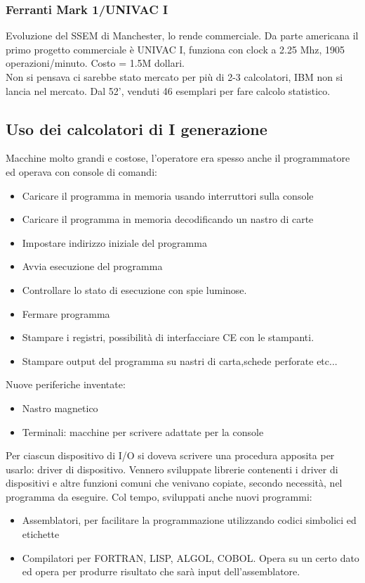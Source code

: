 \documentclass[12pt, oneside]{extbook}
\begin{document}
\subsubsection{Ferranti Mark 1/UNIVAC I}
Evoluzione del SSEM di Manchester, lo rende commerciale. Da parte americana il primo progetto commerciale è UNIVAC I, funziona con clock a 2.25 Mhz, 1905 operazioni/minuto. Costo = 1.5M dollari.\\ Non si pensava ci sarebbe stato mercato per più di 2-3 calcolatori, IBM non si lancia nel mercato. Dal 52', venduti 46 esemplari per fare calcolo statistico.
\subsection{Uso dei calcolatori di I generazione}
Macchine molto grandi e costose, l'operatore era spesso anche il programmatore ed operava con console di comandi:
\begin{itemize}
\item Caricare il programma in memoria usando interruttori sulla console
\item Caricare il programma in memoria decodificando un nastro di carte
\item Impostare indirizzo iniziale del programma
\item Avvia esecuzione del programma
\item Controllare lo stato di esecuzione con spie luminose.
\item Fermare programma
\item Stampare i registri, possibilità di interfacciare CE con le stampanti.
\item Stampare output del programma su nastri di carta,schede perforate etc...
\end{itemize}
Nuove periferiche inventate:
\begin{itemize}
\item Nastro magnetico
\item Terminali: macchine per scrivere adattate per la console
\end{itemize}
Per ciascun dispositivo di I/O si doveva scrivere una procedura apposita per usarlo: driver di dispositivo. Vennero sviluppate librerie contenenti i driver di dispositivi e altre funzioni comuni che venivano copiate, secondo necessità, nel programma da eseguire. Col tempo, sviluppati anche nuovi programmi:
\begin{itemize}
\item Assemblatori, per facilitare la programmazione utilizzando codici simbolici ed etichette
\item Compilatori per FORTRAN, LISP, ALGOL, COBOL. Opera su un certo dato ed opera per produrre risultato che sarà input dell'assemblatore.
\end{itemize}
\end{document}
